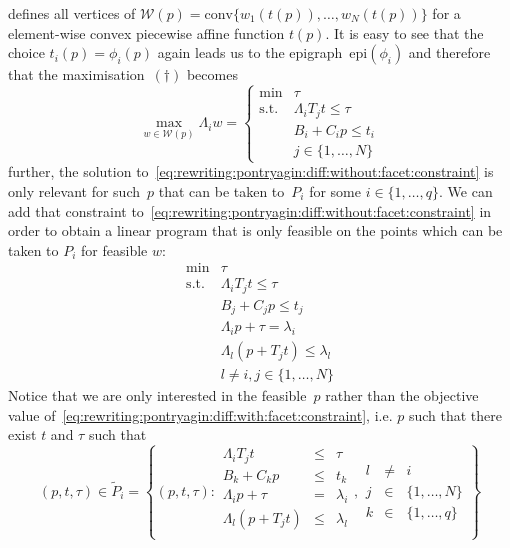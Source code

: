 \documentclass[final]{elsarticle}
\providecommand{\conv}{\text{conv}}
\providecommand{\epi}{\text{epi}}
\theoremstyle{remark}
\theoremstyle{definition}
\begin{document}
%
defines all vertices of $\mathcal W(p) = \conv\{w_1(t(p)),\dots,w_N(t(p))\}$ for a element-wise convex piecewise affine function $t(p)$.
%
It is easy to see that the choice $t_i(p)=\phi_i(p)$ again leads us to the epigraph~$\epi(\phi_i)$ and therefore that the maximisation~$(\dagger)$ becomes
%
\begin{equation}\label{eq:rewriting:pontryagin:diff:without:facet:constraint}
  \max_{w\in\mathcal W(p)}\Lambda_i w = \left\{\begin{array}{rl}
  \min& \tau\\
  \text{s.t.}& \Lambda_iT_jt\leq\tau\\
  & B_i+C_ip\leq t_i\\
  & j\in\{1,\dots,N\}
  \end{array}\right.
\end{equation}
%
further, the solution to~\eqref{eq:rewriting:pontryagin:diff:without:facet:constraint} is only relevant for such~$p$ that can be taken to~$P_i$ for some $i\in\{1,\dots,q\}$.
%
We can add that constraint to~\eqref{eq:rewriting:pontryagin:diff:without:facet:constraint} in order to obtain a linear program that is only feasible on the points which can be taken to $P_i$ for feasible $w$:
%
\begin{equation}\label{eq:rewriting:pontryagin:diff:with:facet:constraint}
  \begin{array}{rl}
  \min& \tau\\
  \text{s.t.}& \Lambda_iT_jt\leq\tau\\
  & B_j+C_j p\leq t_j\\
  &\Lambda_i p + \tau=\lambda_i\\
  &\Lambda_l(p + T_jt)\leq\lambda_l\\
  &l\neq i, j\in\{1,\dots,N\}
  \end{array}
\end{equation}
%
Notice that we are only interested in the feasible~$p$ rather than the objective value of~\eqref{eq:rewriting:pontryagin:diff:with:facet:constraint}, i.e. $p$ such that there exist $t$ and $\tau$ such that 
%
\begin{equation}
  (p,t,\tau)\in\tilde P_i=\left\{(p,t,\tau):\begin{array}{rcl}
  \Lambda_iT_jt&\leq&\tau\\
  B_k+C_k p&\leq& t_k\\
  \Lambda_i p + \tau&=&\lambda_i\\
  \Lambda_l(p + T_jt)&\leq&\lambda_l\\
  \end{array},\begin{array}{rcl}
   l&\neq& i\\
   j&\in&\{1,\dots,N\}\\k&\in&\{1,\dots,q\}\end{array}
   \right\}
\end{equation}
\end{document}
